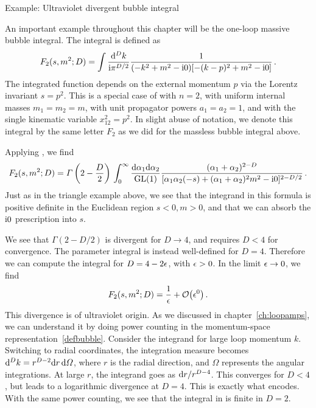 \begin{example}{Example: Ultraviolet divergent bubble integral}

An important example throughout this chapter will be the one-loop massive bubble integral.
The integral is defined as
\begin{align}
F_{2}(s,m^2;D) = \int \frac{\mathrm{d}^{D}k}{\mathrm{i} \pi^{D/2}} \frac{1}{(-k^2+m^2 - \mathrm{i} 0) [-(k-p)^2+m^2- \mathrm{i} 0]} \,.
\label{defbubble}
\end{align}
The integrated function depends on the external momentum $p$ via the Lorentz invariant $s=p^2$.
This is a special case of  with $n=2$, with uniform internal masses $m_1=m_2=m$, with unit propagator powers $a_1=a_2=1$, and with the single kinematic variable $x_{12}^2=p^2$.
In slight abuse of notation, we denote this integral by the same letter $F_2$ as we did for the massless bubble integral above.

Applying , we find
\begin{align}\label{eq:bubbleFeynman} 
F_{2}(s,m^2;D) = \Gamma\left(2-\frac{D}{2}\right)  \, \int_0^\infty \frac{\d \alpha_1 \d\alpha_2}{{\rm GL}(1)} 
\frac{(\alpha_1+\alpha_2)^{2-D} }{[\alpha_1 \alpha_2 (-s) + (\alpha_1 + \alpha_2)^2 m^2 -\i 0]^{2-D/2}  } \,.
\end{align} 
Just as in the triangle example above, we see that the integrand in this formula is positive definite in the Euclidean region $s<0, m>0$, and that we can absorb the $\mathrm{i} 0$ prescription into $s$.

We see that $\Gamma(2-D/2)$ is divergent for $D \to 4$, and requires $D<4$ for convergence. The parameter integral is instead well-defined for $D=4$. Therefore we can compute the integral for $D=4-2\epsilon$, with $\epsilon>0$. In the limit $\epsilon\to0$, we find
\begin{align}\label{BleadingpoleUV}
 F_{2}(s,m^2;D) = 
 \frac{1}{\epsilon}  
 + 
 {\mathcal{O}}\bigl(\epsilon^0\bigr)
  \,.
\end{align}
This divergence is of ultraviolet origin. As we discussed in chapter~\ref{ch:loopamps}, we can understand it by doing power counting in the momentum-space representation~\eqref{defbubble}. Consider the integrand for large loop momentum $k$. Switching to radial coordinates, the integration measure becomes $\d^{D}k = r^{D-2} \d r \, \d\Omega$, where $r$ is the radial direction, and $\Omega$ represents the angular integrations. At large $r$, the integrand goes as $\mathrm{d} r/r^{D-4}$. This converges for $D<4$, but leads to a logarithmic divergence at $D=4$. This is exactly what  encodes.
With the same power counting, we see that the integral in  is finite in $D=2$. 
\end{example}

